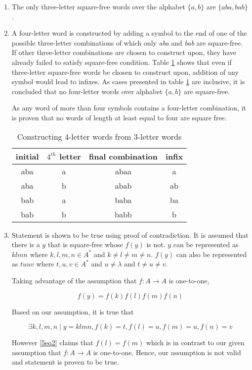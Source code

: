 \begin{enumerate}[label=(\alph*)]

	\item
	The only three-letter square-free words over the alphabet $\{a,b\}$ are $\{aba,bab\}$.

	\item
	A four-letter word is constructed by adding a symbol to the end of one of the possible three-letter combinations of which only \textit{aba} and \textit{bab} are square-free. If other three-letter combinations are chosen to construct upon, they have already failed to satisfy square-free condition. Table \ref{5tab1} shows that even if three-letter square-free words be chosen to construct upon, addition of any symbol would lead to infixes. As cases presented in table \ref{5tab1} are inclusive, it is concluded that no four-letter words over alphabet $\{a,b\}$ are square-free.

	As any word of more than four symbols contains a four-letter combination, it is proven that no words of length at least equal to four are square free.

	\begin{table}
		\centering
		\begin{tabular}{c|c|c|c}
			\textbf{initial} & \textbf{$4^{th}$ letter} & \textbf{final combination} & \textbf{infix}\\
			\hline
			aba & a & abaa & a\\
			aba & b & abab & ab\\
			bab & a & baba & ba\\
			bab & b & babb & b
		\end{tabular}
		\caption{Constructing 4-letter words from 3-letter words}\label{5tab1}
	\end{table}

	\item
	Statement is shown to be true using proof of contradiction. It is assumed that there is a $y$ that is square-free whose $f(y)$ is not. $y$ can be represented as $klmn$ where $k, l, m, n \in A^*$ and $k \neq l \neq m \neq n$. $f(y)$ can also be represented as $tuuv$ where $t, u, v \in A^*$ and $u \neq \lambda$ and $t \neq u \neq v$.

	Taking advantage of the assumption that $f:A\rightarrow A$ is one-to-one,

	\begin{equation}\label{5eq1}
	f(y) = f(k)f(l)f(m)f(n)
	\end{equation}

	Based on our assumption, it is true that

	\begin{equation}\label{5eq2}
	\exists k, l, m, n \mid y = klmn, f(k)=t, f(l)=u, f(m)=u, f(n)=v
	\end{equation}

	However \eqref{5eq2} claims that $f(l) = f(m)$ which is in contrast to our given assumption that $f:A\rightarrow A$ is one-to-one. Hence, our assumption is not valid and statement is proven to be true.

\end{enumerate}

